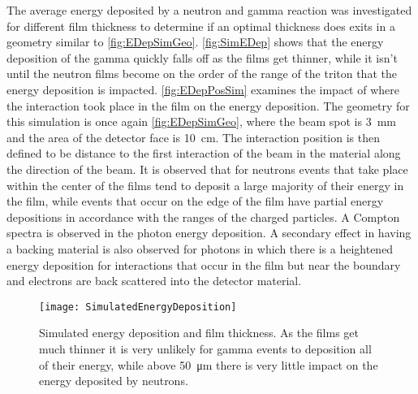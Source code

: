 The average energy deposited by a neutron and gamma reaction was investigated for different film thickness to determine if an optimal thickness does exits in a geometry similar to \autoref{fig:EDepSimGeo}.
\autoref{fig:SimEDep} shows that the energy deposition of the gamma quickly falls off as the films get thinner, while it isn't until the neutron films become on the order of the range of the triton that the energy deposition is impacted.
\autoref{fig:EDepPosSim} examines the impact of where the interaction took place in the film on the energy deposition.
The geometry for this simulation is once again \autoref{fig:EDepSimGeo}, where the beam spot is \SI{3}{\mm} and the area of the detector face is \SI{10}{\cm}. 
The interaction position is then defined to be distance to the first interaction of the beam in the material along the direction of the beam.
It is observed that for neutrons events that take place within the center of the films tend to deposit a large majority of their energy in the film, while events that occur on the edge of the film have partial energy depositions in accordance with the ranges of the charged particles.
A Compton spectra is observed in the photon energy deposition. 
A secondary effect in having a backing material is also observed for photons in which there is a heightened energy deposition for interactions that occur in the film but near the boundary and electrons are back scattered into the detector material.
\begin{figure}
  \centering
  \texttt{[image: SimulatedEnergyDeposition]}
  \caption[Simulated Energy Deposition and Film Thickness]{Simulated energy deposition and film thickness.  As the films get much thinner it is very unlikely for gamma events to deposition all of their energy, while above \SI{50}{\um} there is very little impact on the energy deposited by neutrons.}
  \label{fig:SimEDep}
\end{figure}

